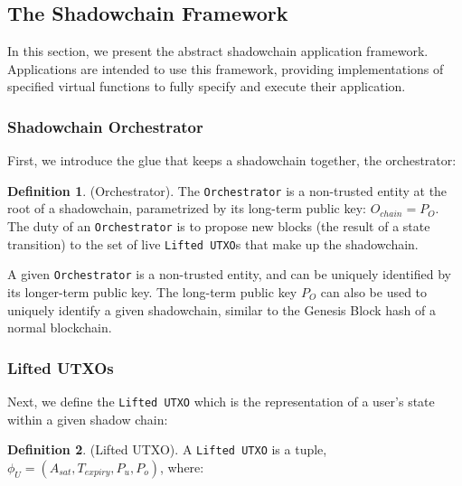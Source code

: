 \documentclass[10pt,a4paper]{article}
\theoremstyle{definition}
\newtheorem{definition}{Definition}[section]
\begin{document}

\subsection{The Shadowchain Framework}

In this section, we present the abstract shadowchain application framework.
Applications are intended to use this framework, providing implementations of
specified virtual functions to fully specify and execute their application.

\subsubsection{Shadowchain Orchestrator}

First, we introduce the glue that keeps a shadowchain together, the
orchestrator:

\theoremstyle{definition}
\begin{definition}{(Orchestrator).} The \texttt{Orchestrator} is a non-trusted
    entity at the root of a shadowchain, parametrized by its long-term public
    key: $O_{chain} = P_{O}$. The duty of an \texttt{Orchestrator} is to
    propose new blocks (the result of a state transition) to the set of live
    \texttt{Lifted UTXO}s that make up the shadowchain.
\end{definition}

A given \texttt{Orchestrator} is a non-trusted entity, and can be uniquely
identified by its longer-term public key. The long-term public key $P_{O}$ can
also be used to uniquely identify a given shadowchain, similar to the Genesis
Block hash of a normal blockchain.

\subsubsection{Lifted UTXOs}

Next, we define the \texttt{Lifted UTXO} which is the representation of a
user's state within a given shadow chain:

\begin{definition}{(Lifted UTXO).} A \texttt{Lifted UTXO} is a tuple, 
    $ \phi_{U} = (A_{sat}, T_{expiry}, P_{u}, P_{o})$, where:
\end{definition}
\end{document}
